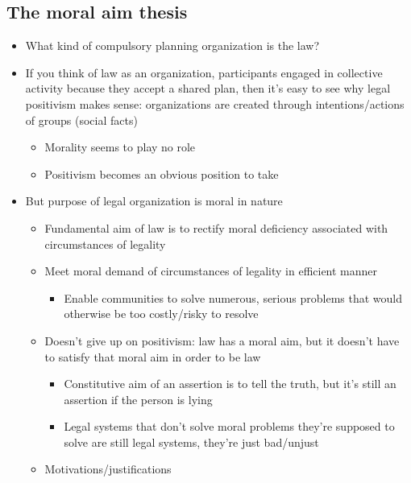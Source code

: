 \hypertarget{the-moral-aim-thesis}{%
\subsection{The moral aim thesis}\label{the-moral-aim-thesis}}

\begin{itemize}
\tightlist
\item
  What kind of compulsory planning organization is the law?
\item
  If you think of law as an organization, participants engaged in
  collective activity because they accept a shared plan, then it's easy
  to see why legal positivism makes sense: organizations are created
  through intentions/actions of groups (social facts)

  \begin{itemize}
  \tightlist
  \item
    Morality seems to play no role
  \item
    Positivism becomes an obvious position to take
  \end{itemize}
\item
  But purpose of legal organization is moral in nature

  \begin{itemize}
  \tightlist
  \item
    Fundamental aim of law is to rectify moral deficiency associated
    with circumstances of legality
  \item
    Meet moral demand of circumstances of legality in efficient manner

    \begin{itemize}
    \tightlist
    \item
      Enable communities to solve numerous, serious problems that would
      otherwise be too costly/risky to resolve
    \end{itemize}
  \item
    Doesn't give up on positivism: law has a moral aim, but it doesn't
    have to satisfy that moral aim in order to be law

    \begin{itemize}
    \tightlist
    \item
      Constitutive aim of an assertion is to tell the truth, but it's
      still an assertion if the person is lying
    \item
      Legal systems that don't solve moral problems they're supposed to
      solve are still legal systems, they're just bad/unjust
    \end{itemize}
  \item
    Motivations/justifications


\end{itemize}
\end{itemize}
